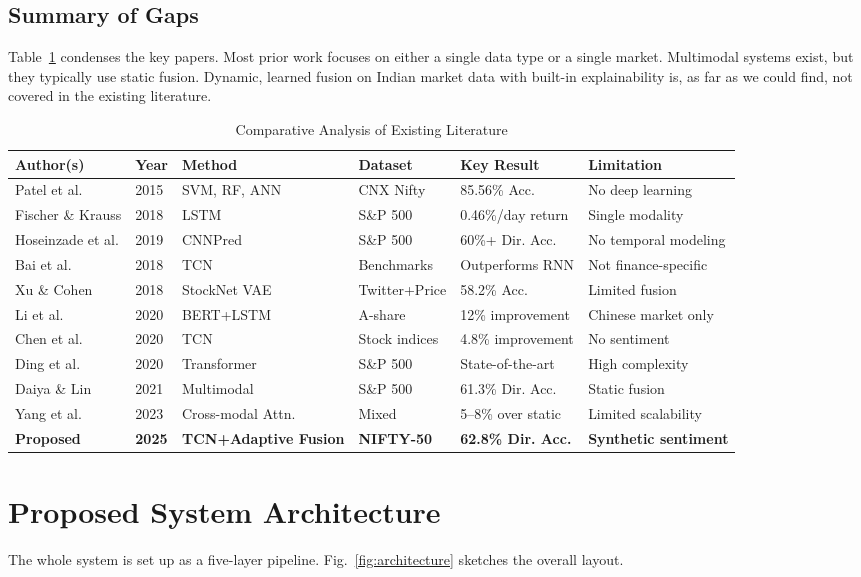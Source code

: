 \documentclass[conference]{IEEEtran}
\begin{document}
\subsection{Summary of Gaps}
Table~\ref{tab:litsurvey} condenses the key papers. Most prior work focuses on either a single data type or a single market. Multimodal systems exist, but they typically use static fusion. Dynamic, learned fusion on Indian market data with built-in explainability is, as far as we could find, not covered in the existing literature.

\begin{table}[htbp]
\caption{Comparative Analysis of Existing Literature}
\label{tab:litsurvey}
\centering
\small
\begin{tabular}{p{2.8cm}p{1.2cm}p{2.5cm}p{2.5cm}p{2.5cm}p{3cm}}
\toprule
\textbf{Author(s)} & \textbf{Year} & \textbf{Method} & \textbf{Dataset} & \textbf{Key Result} & \textbf{Limitation} \\
\midrule
Patel et al. & 2015 & SVM, RF, ANN & CNX Nifty & 85.56\% Acc. & No deep learning \\
Fischer \& Krauss & 2018 & LSTM & S\&P 500 & 0.46\%/day return & Single modality \\
Hoseinzade et al. & 2019 & CNNPred & S\&P 500 & 60\%+ Dir. Acc. & No temporal modeling \\
Bai et al. & 2018 & TCN & Benchmarks & Outperforms RNN & Not finance-specific \\
Xu \& Cohen & 2018 & StockNet VAE & Twitter+Price & 58.2\% Acc. & Limited fusion \\
Li et al. & 2020 & BERT+LSTM & A-share & 12\% improvement & Chinese market only \\
Chen et al. & 2020 & TCN & Stock indices & 4.8\% improvement & No sentiment \\
Ding et al. & 2020 & Transformer & S\&P 500 & State-of-the-art & High complexity \\
Daiya \& Lin & 2021 & Multimodal & S\&P 500 & 61.3\% Dir. Acc. & Static fusion \\
Yang et al. & 2023 & Cross-modal Attn. & Mixed & 5--8\% over static & Limited scalability \\
\textbf{Proposed} & \textbf{2025} & \textbf{TCN+Adaptive Fusion} & \textbf{NIFTY-50} & \textbf{62.8\% Dir. Acc.} & \textbf{Synthetic sentiment} \\
\bottomrule
\end{tabular}
\end{table}

\section{Proposed System Architecture}
The whole system is set up as a five-layer pipeline. Fig.~\ref{fig:architecture} sketches the overall layout.
\end{document}

